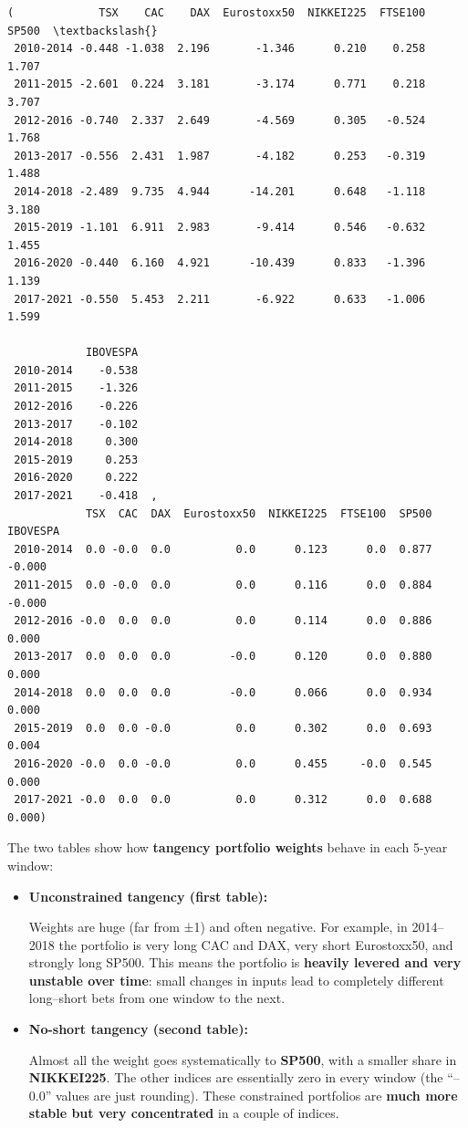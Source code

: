 \documentclass[11pt]{article}
\begin{document}
            \begin{tcolorbox}[breakable, size=fbox, boxrule=.5pt, pad at break*=1mm, opacityfill=0]
\begin{Verbatim}[commandchars=\\\{\}]
(             TSX    CAC    DAX  Eurostoxx50  NIKKEI225  FTSE100  SP500  \textbackslash{}
 2010-2014 -0.448 -1.038  2.196       -1.346      0.210    0.258  1.707
 2011-2015 -2.601  0.224  3.181       -3.174      0.771    0.218  3.707
 2012-2016 -0.740  2.337  2.649       -4.569      0.305   -0.524  1.768
 2013-2017 -0.556  2.431  1.987       -4.182      0.253   -0.319  1.488
 2014-2018 -2.489  9.735  4.944      -14.201      0.648   -1.118  3.180
 2015-2019 -1.101  6.911  2.983       -9.414      0.546   -0.632  1.455
 2016-2020 -0.440  6.160  4.921      -10.439      0.833   -1.396  1.139
 2017-2021 -0.550  5.453  2.211       -6.922      0.633   -1.006  1.599

            IBOVESPA
 2010-2014    -0.538
 2011-2015    -1.326
 2012-2016    -0.226
 2013-2017    -0.102
 2014-2018     0.300
 2015-2019     0.253
 2016-2020     0.222
 2017-2021    -0.418  ,
            TSX  CAC  DAX  Eurostoxx50  NIKKEI225  FTSE100  SP500  IBOVESPA
 2010-2014  0.0 -0.0  0.0          0.0      0.123      0.0  0.877    -0.000
 2011-2015  0.0 -0.0  0.0          0.0      0.116      0.0  0.884    -0.000
 2012-2016 -0.0  0.0  0.0          0.0      0.114      0.0  0.886     0.000
 2013-2017  0.0  0.0  0.0         -0.0      0.120      0.0  0.880     0.000
 2014-2018  0.0  0.0  0.0         -0.0      0.066      0.0  0.934     0.000
 2015-2019  0.0  0.0 -0.0          0.0      0.302      0.0  0.693     0.004
 2016-2020 -0.0  0.0 -0.0          0.0      0.455     -0.0  0.545     0.000
 2017-2021 -0.0  0.0  0.0          0.0      0.312      0.0  0.688     0.000)
\end{Verbatim}
\end{tcolorbox}
        
    The two tables show how \textbf{tangency portfolio weights} behave in
each 5-year window:

\begin{itemize}
\item
  \textbf{Unconstrained tangency (first table):}

  Weights are huge (far from ±1) and often negative. For example, in
  2014--2018 the portfolio is very long CAC and DAX, very short
  Eurostoxx50, and strongly long SP500. This means the portfolio is
  \textbf{heavily levered and very unstable over time}: small changes in
  inputs lead to completely different long--short bets from one window
  to the next.
\item
  \textbf{No-short tangency (second table):}

  Almost all the weight goes systematically to \textbf{SP500}, with a
  smaller share in \textbf{NIKKEI225}. The other indices are essentially
  zero in every window (the ``--0.0'' values are just rounding). These
  constrained portfolios are \textbf{much more stable but very
  concentrated} in a couple of indices.
\end{itemize}
\end{document}
